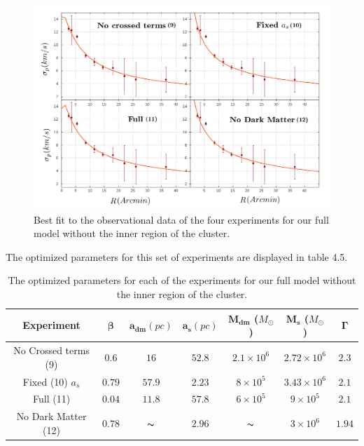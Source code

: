 \begin{figure}[H]
\centering
\includegraphics[width=15cm]{images/all_params_refinado_10.png}
\caption[Best fit of the full model without the inner region]{Best fit to the observational data of the four experiments for our full model without the inner region of the cluster.}
\end{figure}

The optimized parameters for this set of experiments are displayed in table 4.5.

\begin{table}[H]
\centering
\begin{tabular}{| c| c| c| c| c| c| c|}
    \hline
    \textbf{Experiment} & $\mathbf{\beta}$ & $\mathbf{a_{dm}} (pc)$ & $\mathbf{a_{s}} (pc)$ & $\mathbf{M_{dm}}$ ($M_{\odot}$) & $\mathbf{M_{s}}$ ($M_{\odot}$) & $\mathbf{\Gamma}$\\ \hline
	No Crossed terms (9) & $0.6$ &	$16$ &	$52.8$ &	$2.1 \times 10^{6}$ &	$2.72 \times 10^{6}$ &	$2.3$\\ \hline
	Fixed (10) $a_s$ &	$0.79$ &	$57.9$ &	$\mathbf{2.23}$ &	$8 \times 10^{5}$ &	$3.43 \times 10 ^{6}$ &	$2.1$\\ \hline
	Full (11) &	$0.04$ &	$11.8$ &	$57.8$ &	$6 \times 10^{5}$ &	$9 \times 10^{5}$ &	$2.1$\\ \hline
	No Dark Matter (12) &	$0.78$ &	$\thicksim$ & $2.96$ &	$\thicksim$ & $ 3 \times 10^{6}$ & 	$1.94$\\
    \hline
  \end{tabular} 
\caption[Optimized parameters for our full model without the inner region.]{The optimized parameters for each of the experiments for our full model without the inner region of the cluster.}
\end{table}

